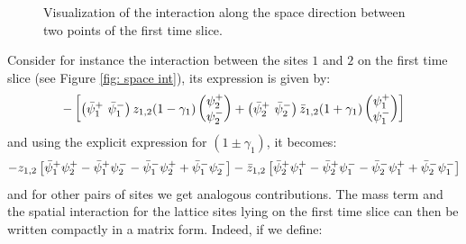 \begin{figure}


    \caption{Visualization of the interaction along the space direction between two points of the first time slice.}
    \label{fig: space int}
\end{figure}
Consider for instance the interaction between the sites $1$ and $2$ on the first time slice (see Figure \eqref{fig: space int}), its expression is given by:
\begin{equation}
    - \left[ \begin{pmatrix}
        \Bar{\psi}^+_1 \,\, \Bar{\psi}^-_1
    \end{pmatrix} z_{1,2} (1 - \gamma_1) \begin{pmatrix}
        \psi^+_2 \\
        \psi^-_2
    \end{pmatrix} + \begin{pmatrix}
        \Bar{\psi}^+_2 \,\, \Bar{\psi}^-_2
    \end{pmatrix} \Bar{z}_{1,2} (1 + \gamma_1) \begin{pmatrix}
        \psi^+_1 \\
        \psi^-_1
    \end{pmatrix} \right]
\end{equation}
and using the explicit expression for $(1 \pm \gamma_1)$, it becomes:
\begin{equation}
    - z_{1,2} \left[ \Bar{\psi}^+_1 \psi_2^+ - \Bar{\psi}^+_1 \psi_2^- - \Bar{\psi}_1^-\psi_2^+ + \Bar{\psi}_1^- \psi_2^- \right] - \Bar{z}_{1,2} \left[ \Bar{\psi}^+_2 \psi_1^+ - \Bar{\psi}^+_2 \psi_1^- - \Bar{\psi}_2^-\psi_1^+ + \Bar{\psi}_2^- \psi_1^- \right]
\end{equation}
and for other pairs of sites we get analogous contributions. The mass term and the spatial interaction for the lattice sites lying on the first time slice can then be written compactly in a matrix form. Indeed, if we define:
